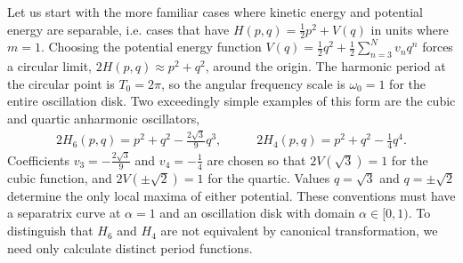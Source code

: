 \documentclass[nofootinbib,preprint]{revtex4-1}
\begin{document}
Let us start with the more familiar cases where kinetic energy and potential energy are 
separable, i.e. cases that have $H(p,q) = \frac{1}{2}p^2+V(q)$ in units where $m=1$. Choosing the 
potential energy function $V(q)=\frac{1}{2}q^2 + \frac{1}{2}\sum_{n=3}^{N}v_n q^n$ 
forces a circular limit, $2 H(p,q) \approx p^2 + q^2$, around the origin. The harmonic period
at the circular point is $T_0=2\pi$, so the angular frequency scale is $\omega_0=1$ for 
the entire oscillation disk. Two exceedingly simple examples of this form are the cubic and 
quartic anharmonic oscillators,
\begin{eqnarray}
2H_6(p,q) = p^2 + q^2 -\frac{2\sqrt{3}}{9}q^3, 
\;\;\;\;\;\;\;\;\;\; 
2 H_4(p,q) = p^2 + q^2 -\frac{1}{4}q^4.  \nonumber
\end{eqnarray}
Coefficients $v_3=-\frac{2\sqrt{3}}{9}$ and $v_4=-\frac{1}{4}$ are chosen so that 
$2V(\sqrt{3})=1$ for the cubic function, and $2V(\pm \sqrt{2})=1$ for the quartic. Values 
$q=\sqrt{3}$ and $q=\pm \sqrt{2}$ determine the only local maxima of either potential.
These conventions must have a separatrix curve at $\alpha = 1$ and an oscillation disk 
with domain $\alpha \in [0,1)$. To distinguish that $H_6$ and $H_4$ are not equivalent 
by canonical transformation, we need only calculate distinct period functions. 
\end{document}
